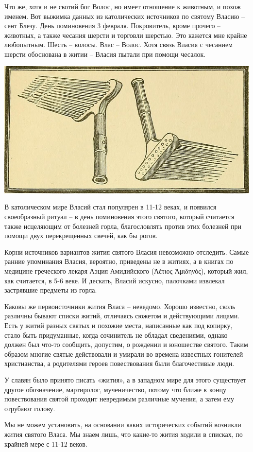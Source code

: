    Что же, хотя и не скотий бог Волос, но имеет отношение к животным, и похож именем. Вот выжимка данных из католических источников по святому Власию – сент Блезу. День поминовения 3 февраля. Покровитель, кроме прочего – животных, а также чесания шерсти и торговли шерстью. Это кажется мне крайне любопытным. Шесть – волосы. Влас – Волос. Хотя связь Власия с чесанием шерсти обоснована в житии – Власия пытали при помощи чесалок.

\begin{center}
\includegraphics[width=0.50\linewidth]{chast-colebanie-osnov/tur/combs.jpg}
\end{center}

   В католическом мире Власий стал популярен в 11-12 веках, и появился своеобразный ритуал – в день поминовения этого святого, который считается также исцеляющим от болезней горла, благословлять против этих болезней при помощи двух перекрещенных свечей, как бы рогов.

   Корни источников вариантов жития святого Власия невозможно отследить. Самые ранние упоминания Власия, вероятно, приведены не в житиях, а в книгах по медицине греческого лекаря Аэция Амидийского (Ἀέτιος Ἀμιδηνός), который жил, как считается, в 5-6 веке. И дескать, Власий искусно, палочками извлекал застрявшие предметы из горла.

   Каковы же первоисточники жития Власа – неведомо. Хорошо известно, сколь различны бывают списки житий, отличаясь сюжетом и действующими лицами. Есть у житий разных святых и похожие места, написанные как под копирку, стало быть придуманные, когда сочинитель не обладал сведениями, однако должен был что-то сообщить, допустим, о рождении и юношестве святого. Таким образом многие святые действовали и умирали во времена известных гонителей христианства, а родителями героев повествования были благочестивые люди. 

   У славян было принято писать «жития», а в западном мире для этого существует другое обозначение, мартиролог, мученичество, потому что ближе к концу повествования святой проходит невредимым различные мучения, а затем ему отрубают голову. 

    Мы не можем установить, на основании каких исторических событий возникли жития святого Власа. Мы знаем лишь, что какие-то жития ходили в списках, по крайней мере с 11-12 веков.

